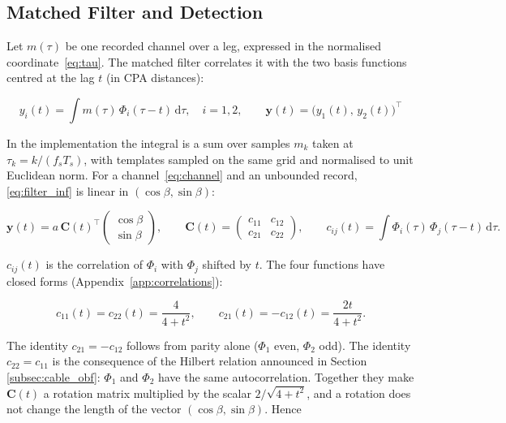 \subsection{Matched Filter and Detection}\label{sec:detection}

Let $m(\tau)$ be one recorded channel over a leg, expressed in the normalised coordinate~\eqref{eq:tau}. The matched filter correlates it with the two basis functions centred at the lag $t$ (in CPA distances):

\begin{equation}
    y_i(t) = \int m(\tau)\,\Phi_i(\tau - t)\,\mathrm{d}\tau, \quad i = 1,2, \qquad \mathbf{y}(t) = \big(y_1(t),\, y_2(t)\big)^{\top}
    \label{eq:filter_inf}
\end{equation}

In the implementation the integral is a sum over samples $m_k$ taken at $\tau_k = k/(f_s T_s)$, with templates sampled on the same grid and normalised to unit Euclidean norm. For a channel~\eqref{eq:channel} and an unbounded record, \eqref{eq:filter_inf} is linear in $(\cos \beta, \sin \beta)$:

\begin{equation}
    \mathbf{y}(t) = a\,\mathbf{C}(t)^{\top}\begin{pmatrix}\cos\beta \\ \sin\beta\end{pmatrix}, \qquad \mathbf{C}(t) = \begin{pmatrix} c_{11} & c_{12} \\ c_{21} & c_{22} \end{pmatrix}, \qquad c_{ij}(t) = \int \Phi_i(\tau)\,\Phi_j(\tau - t)\,\mathrm{d}\tau.
    \label{eq:filter_out_decomposed}
\end{equation}

$c_{ij}(t)$ is the correlation of $\Phi_i$ with $\Phi_j$ shifted by $t$. The four functions have closed forms (Appendix~\ref{app:correlations}):

\begin{equation}
    c_{11}(t) = c_{22}(t) = \frac{4}{4 + t^2}, \qquad c_{21}(t) = -c_{12}(t) = \frac{2t}{4 + t^2}.
    \label{eq:cij}
\end{equation}

The identity $c_{21} = -c_{12}$ follows from parity alone ($\Phi_1$ even, $\Phi_2$ odd). The identity $c_{22} = c_{11}$ is the consequence of the Hilbert relation announced in Section \ref{subsec:cable_obf}: $\Phi_1$ and $\Phi_2$ have the same autocorrelation. Together they make $\mathbf{C}(t)$ a rotation matrix multiplied by the scalar $2/\sqrt{4 + t^2}$, and a rotation does not change the length of the vector $(\cos\beta, \sin\beta)$. Hence

